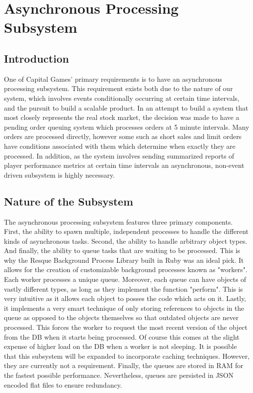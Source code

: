\section{Asynchronous Processing Subsystem}

\subsection{Introduction}

One of Capital Games' primary requirements is to have an asynchronous processing subsystem. This requirement exists both due to the nature of our system, which involves events conditionally occurring at certain time intervals, and the pursuit to build a scalable product. In an attempt to build a system that most closely represents the real stock market, the decision was made to have a pending order queuing system which processes orders at 5 minute intervals. Many orders are processed directly, however some such as short sales and limit orders have conditions associated with them which determine when exactly they are processed. In addition, as the system involves sending summarized reports of player performance metrics at certain time intervals an asynchronous, non-event driven subsystem is highly necessary.\\

\subsection{Nature of the Subsystem}

The asynchronous processing subsystem features three primary components. First, the ability to spawn multiple, independent processes to handle the different kinds of asynchronous tasks. Second, the ability to handle arbitrary object types. And finally, the ability to queue tasks that are waiting to be processed. This is why the Resque Background Process Library built in Ruby was an ideal pick. It allows for the creation of customizable background processes known as "workers". Each worker processes a unique queue. Moreover, each queue can have objects of vastly different types, as long as they implement the function "perform". This is very intuitive as it allows each object to posses the code which acts on it. Lastly, it implements a very smart technique of only storing references to objects in the queue as opposed to the objects themselves so that outdated objects are never processed. This forces the worker to request the most recent version of the object from the DB when it starts being processed. Of course this comes at the slight expense of higher load on the DB when a worker is not sleeping. It is possible that this subsystem will be expanded to incorporate caching techniques. However, they are currently not a requirement. Finally, the queues are stored in RAM for the fastest possible performance. Nevertheless, queues are persisted in JSON encoded flat files to ensure redundancy.\\

